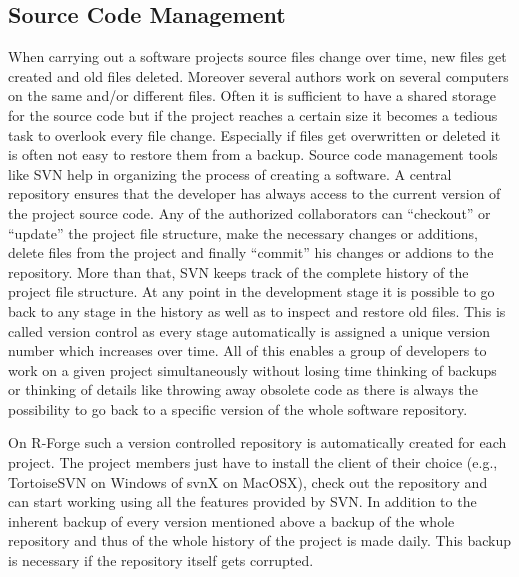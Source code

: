 \subsection{Source Code Management}

When carrying out a software projects source files change over time,
new files get created and old files deleted. Moreover several authors
work on several computers on the same and/or different files. Often it
is sufficient to have a shared storage for the source code but if the
project reaches a certain size it becomes a tedious task to overlook
every file change. Especially if files get overwritten or deleted it
is often not easy to restore them from a backup. Source
code management tools like SVN help in organizing the process of
creating a software. A central repository ensures that the developer
has always access to the current version of the project source
code. Any of the authorized collaborators can ``checkout'' or
``update'' the project
file structure, make the necessary changes or additions, delete
files from the project and finally ``commit'' his changes or addions
to the repository. More than
that, SVN keeps track of the complete history of the project file
structure. At any point in the development stage it is possible to go
back to any stage in the history as well as to inspect and restore old
files. This is called version control as every stage automatically is
assigned a unique version number which increases over time. 
All of this enables a group of developers to work on a given project
simultaneously without losing time thinking of backups or thinking of
details like throwing away obsolete code as there is always the possibility to 
go back to a specific version of the whole software repository.

On R-Forge such a version controlled repository is automatically
created for each project. The project members just have to install
the client of their choice (e.g., TortoiseSVN on Windows of svnX on
MacOSX), check out the repository and can start working using all the
features provided by SVN. In addition to the inherent backup of every
version mentioned above a backup of the whole repository and thus of
the whole history of the project is made daily. This backup is necessary if
the repository itself gets corrupted. 



